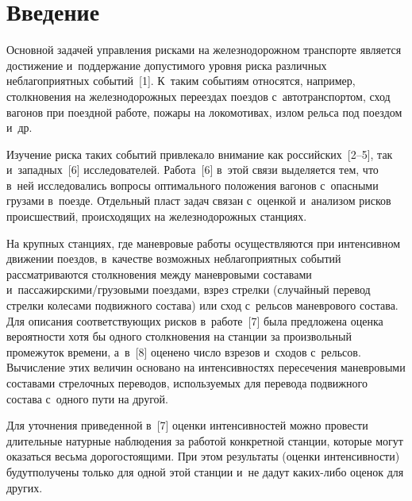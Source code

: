 
  



\thispagestyle{headings}

\begin{multicols}{2}

\label{st\stat}

\section{Введение}

      Основной задачей управления рисками на железнодорожном транспорте 
является достижение и~поддержание допустимого уровня риска различных 
неблагоприятных событий~[1]. К~таким событиям относятся, например, 
столкновения на железнодорожных переездах поездов с~автотранспортом, сход 
вагонов при поездной работе, пожары на локомотивах, излом рельса под поездом и~др. 

Изучение риска таких событий привлекало внимание как российских~[2--5], 
так и~западных~[6] исследователей. Работа~[6] в~этой связи выделяется тем, что 
в~ней исследовались вопросы оптимального положения вагонов с~опасными 
грузами в~поезде. Отдельный пласт задач связан с~оценкой и~анализом рисков 
происшествий, происходящих на железнодорожных станциях.
      
      На крупных станциях, где маневровые работы осуществляются при 
интенсивном движении поездов, в~качестве возможных неблагоприятных событий 
рассматриваются столкновения между маневровыми составами 
и~пассажирскими/грузовыми поездами, взрез стрелки (случайный перевод 
стрелки колесами подвижного состава) или сход с~рельсов маневрового состава. 
Для описания соответствующих рисков в~работе~[7] была предложена оценка 
вероятности хотя бы одного столкновения на станции за произвольный 
промежуток времени, а~в~[8] оценено число взрезов и~сходов с~рельсов. 
Вычисление этих величин основано на интенсивностях пересечения маневровыми 
составами стрелочных переводов, используемых для перевода подвижного состава с~одного пути на другой. 

Для уточнения приведенной в~[7] оценки 
интенсивностей можно провести длительные натурные наблюдения за работой 
конкретной станции, которые могут оказаться весьма дорогостоящими. При\linebreak
 этом 
результаты (оценки интенсивности) будут\linebreak получены только для одной этой 
станции и~не дадут ка\-ких-ли\-бо оценок для других. 


\end{multicols}
